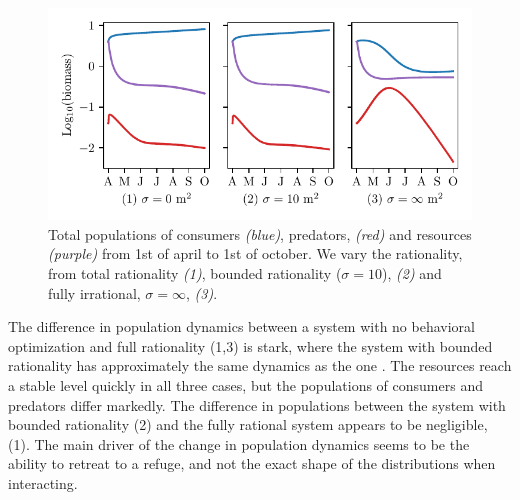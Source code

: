 \begin{figure}[H]
\includegraphics{plots/populations.pdf}
\caption{Total populations of consumers \emph{(blue)}, predators, \emph{(red)} and resources \emph{(purple)} from 1st of april to 1st of october. We vary the rationality, from total rationality \emph{(1)}, bounded rationality ($\sigma = 10$), \emph{(2)} and fully irrational, $\sigma = \infty$, \emph{(3)}.}
\label{fig:long_term_populations}

\end{figure}
The difference in population dynamics between a system with no behavioral optimization and full rationality (1,3) is stark, where the system with bounded rationality has approximately the same dynamics as the one . The resources reach a stable level quickly in all three cases, but the populations of consumers and predators differ markedly. The difference in populations between the system with bounded rationality (2) and the fully rational system appears to be negligible, (1). The main driver of the change in population dynamics seems to be the ability to retreat to a refuge, and not the exact shape of the distributions when interacting.



